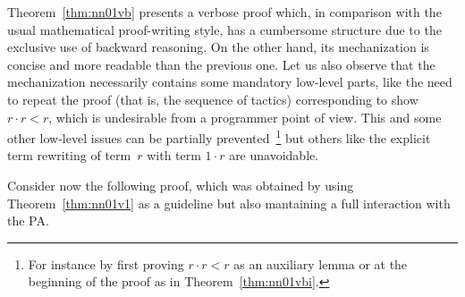 \documentclass[11pt,letterpaper]{article}
\begin{document}

Theorem~\ref{thm:nn01vb} presents a verbose proof which, in comparison with the 
usual mathematical proof-writing style, has a cumbersome structure due to the 
exclusive use of backward reasoning. On the other hand, its mechanization is 
concise and more readable than the previous one.
Let us also observe that the mechanization necessarily contains some mandatory 
low-level parts, like the need to repeat the proof (that is, the sequence of 
tactics) corresponding to show $r\cdot r < r$, which is undesirable from a 
programmer point of view. This and some other low-level issues can be 
partially prevented~\footnote{For instance by first proving 
$r\cdot r < r$ as an auxiliary lemma or at the beginning of the proof as in
Theorem~\ref{thm:nn01vbi}.}
but others like the explicit term rewriting of term~$r$ with term $1\cdot r$ 
are unavoidable. 



Consider now the following proof, which was obtained by using 
Theorem~\ref{thm:nn01v1} as a guideline but also mantaining a full interaction 
with the PA.
\end{document}
